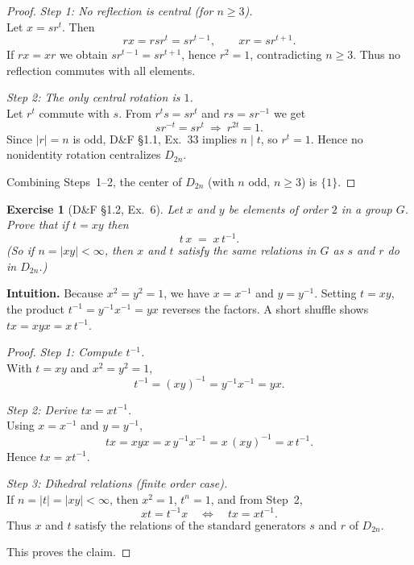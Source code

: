 \documentclass[12pt]{article}
\newtheorem{exercise}[theorem]{Exercise}
\theoremstyle{definition}
\begin{document}
\dotfill

\begin{proof}
\noindent\emph{Step 1: No reflection is central (for $n\ge 3$).}\\

\noindent
Let $x=sr^{t}$. Then
\[
rx=rsr^{t}=sr^{t-1},\qquad xr=sr^{t+1}.
\]
If $rx=xr$ we obtain $sr^{t-1}=sr^{t+1}$, hence $r^{2}=1$, contradicting $n\ge 3$.
Thus no reflection commutes with all elements.

\dotfill

\noindent\emph{Step 2: The only central rotation is $1$.}\\

\noindent
Let $r^{t}$ commute with $s$. From $r^{t}s=sr^{t}$ and $rs=sr^{-1}$ we get
\[
sr^{-t}=sr^{t}\ \Longrightarrow\ r^{2t}=1.
\]
Since $|r|=n$ is odd, D\&F §1.1, Ex.~33 implies $n\mid t$, so $r^{t}=1$.
Hence no nonidentity rotation centralizes $D_{2n}$.

\dotfill

Combining Steps~1–2, the center of $D_{2n}$ (with $n$ odd, $n\ge3$) is $\{1\}$.
\end{proof}

\newpage

\begin{exercise}[D\&F §1.2, Ex.~6]
Let $x$ and $y$ be elements of order $2$ in a group $G$. Prove that if $t=xy$ then
\[
t\,x \;=\; x\,t^{-1}.
\]
(So if $n=\lvert xy\rvert<\infty$, then $x$ and $t$ satisfy the same relations in $G$ as $s$ and $r$ do in $D_{2n}$.)
\end{exercise}

\dotfill

\noindent
\textbf{Intuition.}
Because $x^2=y^2=1$, we have $x=x^{-1}$ and $y=y^{-1}$. Setting $t=xy$,
the product $t^{-1}=y^{-1}x^{-1}=yx$ reverses the factors. A short shuffle shows
$tx=xyx=x\,t^{-1}$.

\dotfill

\begin{proof}
\noindent\emph{Step 1: Compute $t^{-1}$.}\\

\noindent
With $t=xy$ and $x^2=y^2=1$,
\[
t^{-1}=(xy)^{-1}=y^{-1}x^{-1}=yx.
\]

\dotfill

\noindent\emph{Step 2: Derive $tx=xt^{-1}$.}\\

\noindent
Using $x=x^{-1}$ and $y=y^{-1}$,
\[
tx=xyx=x\,y^{-1}x^{-1}=x\,(xy)^{-1}=x\,t^{-1}.
\]
Hence $tx=xt^{-1}$.

\dotfill

\noindent\emph{Step 3: Dihedral relations (finite order case).}\\

\noindent
If $n=|t|=|xy|<\infty$, then $x^2=1$, $t^n=1$, and from Step~2,
\[
xt = t^{-1}x \quad\Longleftrightarrow\quad tx=xt^{-1}.
\]
Thus $x$ and $t$ satisfy the relations of the standard generators $s$ and $r$ of $D_{2n}$.

\dotfill

This proves the claim.
\end{proof}
\end{document}

